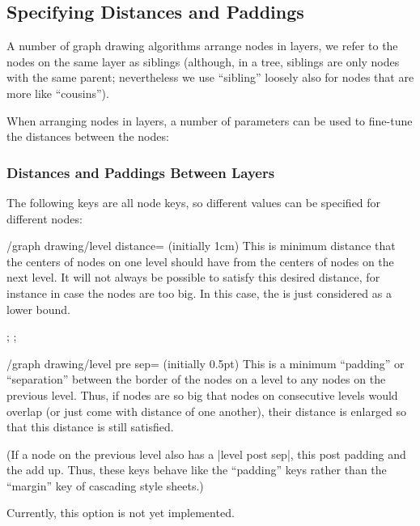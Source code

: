 \subsection{Specifying Distances and Paddings}

\label{subsection-gd-dist-pad}

A number of graph drawing algorithms arrange nodes in layers, we refer
to the nodes on the same layer as siblings (although, in a tree,
siblings are only nodes with the same parent; nevertheless we use
``sibling'' loosely also for nodes that are more like ``cousins'').

When arranging nodes in layers, a number of parameters can be used to
fine-tune the distances between the nodes:


\subsubsection{Distances and Paddings Between Layers}

The following keys are all node keys, so different values can be specified
for different nodes:

\begin{key}{/graph drawing/level distance= (initially 1cm)}
  This is minimum distance that the centers of nodes on one
  level should have from the centers of nodes on the next level. It
  will not always be possible to satisfy this desired distance, for
  instance in case the nodes are too big. In this case, the
   is just considered as a lower bound.
\begin{codeexample}[]
\tikz {};  
\tikz {};  
\end{codeexample}
\end{key}

\begin{key}{/graph drawing/level pre sep= (initially 0.5pt)}
  This is a minimum ``padding'' or ``separation'' between the border
  of the nodes on a level to any nodes on the previous level. Thus, if
  nodes are so big that nodes on consecutive levels would overlap (or
  just come with  distance of one another), their
  distance is enlarged so that this distance is still satisfied.

  (If a node on the previous level also has a |level post sep|, this
  post padding and the  add up. Thus, these keys
  behave like the ``padding'' keys rather
  than the ``margin'' key of cascading style sheets.)
  
  Currently, this option is not yet implemented.
\end{key}

